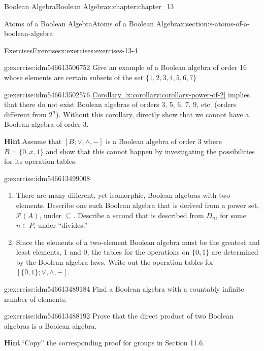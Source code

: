 \documentclass[oneside,10pt,]{book}
\newcommand{\blocktitlefont}{\relax}
\newcommand{\xreffont}{\relax}
\numberwithin{equation}{section}
\begin{document}
\begin{chapterptx}{Boolean Algebra}{}{Boolean Algebra}{}{}{x:chapter:chapter_13}
\begin{sectionptx}{Atoms of a Boolean Algebra}{}{Atoms of a Boolean Algebra}{}{}{x:section:s-atoms-of-a-boolean-algebra}
\begin{exercises-subsection}{Exercises}{}{Exercises}{}{}{x:exercises:exercises-13-4}
\begin{divisionexercise}{4}{}{}{g:exercise:idm546613506752}%
Give an example of a Boolean algebra of order 16 whose elements are certain subsets of the set \(\{1, 2, 3, 4, 5, 6, 7\}\)%
\end{divisionexercise}%
\begin{divisionexercise}{5}{}{}{g:exercise:idm546613502576}%
\hyperref[x:corollary:corollary-power-of-2]{Corollary~{\xreffont\ref{x:corollary:corollary-power-of-2}}} implies that there do not exist Boolean algebras of orders 3, 5, 6, 7, 9, etc. (orders different from \(2^n\)). Without this corollary, directly show that we cannot have a Boolean algebra of order 3.%
\par\smallskip%
\noindent\textbf{\blocktitlefont Hint}.\hypertarget{g:hint:idm546613500688}{}\quad{}Assume that \([B; \lor , \land, - ]\) is a Boolean algebra of order 3 where \(B = \{0,
x, 1\}\) and show that this cannot happen by investigating the possibilities for its operation tables.%
\end{divisionexercise}%
\begin{divisionexercise}{6}{}{}{g:exercise:idm546613499008}%
%
\begin{enumerate}[label=(\alph*)]
\item{}There are many different, yet isomorphic, Boolean algebras with two elements. Describe one such Boolean algebra that is derived from a power set, \(\mathcal{P}(A)\), under \(\subseteq\). Describe a second that is described from \(D_n\), for some \(n \in  P\), under ``divides.''%
\item{}Since the elements of a two-element Boolean algebra must be the greatest and least elements, 1 and 0, the tables for the operations on \(\{0, 1\}\) are determined by the Boolean algebra laws. Write out the operation tables for \([\{0, 1\}; \lor , \land, -]\).%
\end{enumerate}
%
\end{divisionexercise}%
\begin{divisionexercise}{7}{}{}{g:exercise:idm546613489184}%
Find a Boolean algebra with a countably infinite number of elements.%
\end{divisionexercise}%
\begin{divisionexercise}{8}{}{}{g:exercise:idm546613488192}%
Prove that the direct product of two Boolean algebras is a Boolean algebra.%
\par\smallskip%
\noindent\textbf{\blocktitlefont Hint}.\hypertarget{g:hint:idm546613480176}{}\quad{}``Copy'' the corresponding proof for groups in Section 11.6.%

\end{divisionexercise}
\end{exercises-subsection}
\end{sectionptx}
\end{chapterptx}
\end{document}

